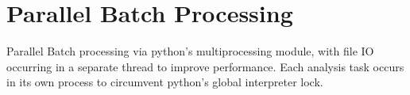 \section{Parallel Batch Processing}
\label{batch_processing}

Parallel Batch processing via python's multiprocessing module, with file IO occurring in a separate thread to improve performance.  Each analysis task occurs in its own process to circumvent python's global interpreter lock.